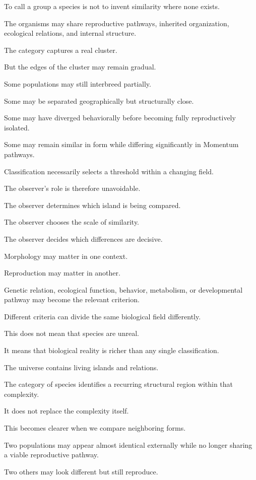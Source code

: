 To call a group a species is not to invent similarity where none exists.

The organisms may share reproductive pathways, inherited organization, ecological relations, and internal structure.

The category captures a real cluster.

But the edges of the cluster may remain gradual.

Some populations may still interbreed partially.

Some may be separated geographically but structurally close.

Some may have diverged behaviorally before becoming fully reproductively isolated.

Some may remain similar in form while differing significantly in Momentum pathways.

Classification necessarily selects a threshold within a changing field.

The observer’s role is therefore unavoidable.

The observer determines which island is being compared.

The observer chooses the scale of similarity.

The observer decides which differences are decisive.

Morphology may matter in one context.

Reproduction may matter in another.

Genetic relation, ecological function, behavior, metabolism, or developmental pathway may become the relevant criterion.

Different criteria can divide the same biological field differently.

This does not mean that species are unreal.

It means that biological reality is richer than any single classification.

The universe contains living islands and relations.

The category of species identifies a recurring structural region within that complexity.

It does not replace the complexity itself.

This becomes clearer when we compare neighboring forms.

Two populations may appear almost identical externally while no longer sharing a viable reproductive pathway.

Two others may look different but still reproduce.

